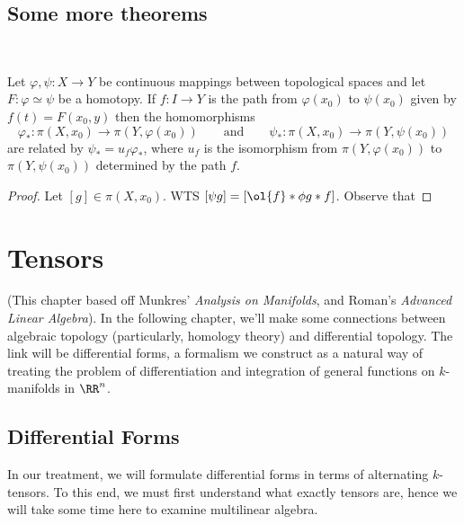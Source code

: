 \documentclass{fkbook}
\theoremstyle{snazzydefinition}
\begin{document}
\begin{adjustwidth}{1em}{}
  \section*{Some more theorems}~
  \begin{theorem}
    Let $\varphi, \psi : X \to Y$ be continuous mappings between
    topological spaces and let $F : \varphi \simeq \psi$ be a
    homotopy. If $f : I \to Y$ is the path from $\varphi(x_0)$ to
    $\psi(x_0)$ given by $f(t) = F(x_0, y)$ then the homomorphisms
    \[
      \varphi_* : \pi(X, x_0) \to \pi(Y, \varphi(x_0)) \qquad
      \text{and} \qquad \psi_* : \pi(X,x_0) \to \pi(Y, \psi(x_0))
    \]
    are related by $\psi_* = u_f \varphi_*$, where $u_f$ is the
    isomorphism from $\pi(Y, \varphi(x_0))$ to $\pi(Y, \psi(x_0))$
    determined by the path $f$.
  \end{theorem}
  \begin{proof}
    Let $[g] \in \pi(X, x_0)$. WTS $[\psi g] = [\ol{f} * \phi g * f]$.
    Observe that
  \end{proof}
\end{adjustwidth}

\chapter{Tensors}
(This chapter based off Munkres' \emph{Analysis on Manifolds}, and
Roman's \emph{Advanced Linear Algebra}). In the following chapter,
we'll make some connections between algebraic topology (particularly,
homology theory) and differential topology. The link will be
differential forms, a formalism we construct as a natural way of
treating the problem of differentiation and integration of general
functions on $k$-manifolds in $\RR^n$.
\section{Differential Forms}
In our treatment, we will formulate differential forms in terms of
alternating $k$-tensors. To this end, we must first understand what
exactly tensors are, hence we will take some time here to examine
multilinear algebra.
\end{document}
